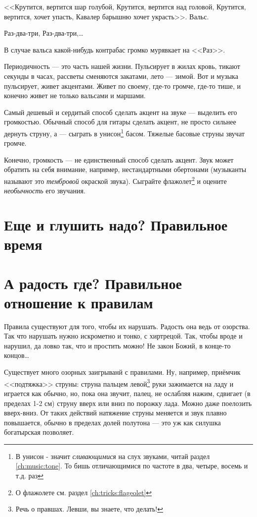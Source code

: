 <<Крутится, вертится шар голубой, Крутится, вертится над головой, Крутится, вертится, хочет упасть, Кавалер барышню хочет украсть>>. Вальс. 
\begin{center}
    Раз-два-три, Раз-два-три,\ldots 
\end{center}
В случае вальса какой-нибудь контрабас громко мурявкает на <<Раз>>.

Периодичность --- это часть нашей жизни. Пульсирует в жилах кровь, тикают секунды в часах, рассветы сменяются закатами, лето --- зимой. Вот и музыка пульсирует, живет акцентами. Живет по своему, где-то громче, где-то тише, и конечно живет не только вальсами и маршами.

Самый дешевый и сердитый способ сделать акцент на звуке --- выделить его громкостью. Обычный способ для гитары сделать акцент, не просто сильнее дернуть струну, а --- сыграть в унисон\footnote{В унисон - значит \emph{сливающимися} на слух звуками, читай раздел \ref{ch:music:tone}. То бишь отличающимися по частоте в два, четыре, восемь и т.д. раз} басом. Тяжелые басовые струны звучат громче.

Конечно, громкость --- не единственный способ сделать акцент. Звук может обратить на себя внимание, например, нестандартными обертонами (музыканты называют это \emph{тембровой} окраской звука). Сыграйте флажолет\footnote{О флажолете см. раздел \ref{ch:tricks:flageolet}} и оцените \emph{необычность} его звучания.


\section{Еще и глушить надо? Правильное время}
\label{ch:music:rythm}



\section{А радость где? Правильное отношение к правилам}
\label{ch:music:rules}

Правила существуют для того, чтобы их нарушать. Радость она ведь от озорства. Так что нарушать нужно искрометно и тонко, с хиртрецой. Так, чтобы вроде и нарушил, да ловко так, что и простить можно! Не закон Божий, в конце-то концов\ldots

Существует много озорных заигрыванй с правилами. Ну, например, приёмчик <<подтяжка>> струны: струна пальцем левой\footnote{Речь о правшах. Левши, вы знаете, что делать!} руки зажимается на ладу и играется как обычно, но, пока она звучит, палец, не ослабляя нажим, сдвигает (в пределах 1-2 см) струну вверх или вниз по порожку лада. Можно даже поелозить вверх-вниз. От таких действий натяжение струны меняется и звук плавно повышается, обычно в пределах долей полутона --- это уж как силушка богатырская позволяет. 

